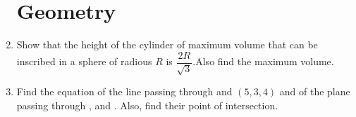 \begin{enumerate}
\section*{Geometry}
\item Show that the height of the cylinder of  maximum volume that can be inscribed in a sphere of radious $R$ is $\dfrac{2R}{\sqrt{3}}$.Also find the maximum volume.
\item Find the equation of the line passing through  and ${(5, 3, 4)}$ and of the plane passing through ,  and . Also, find their point of intersection.      
\end{enumerate}